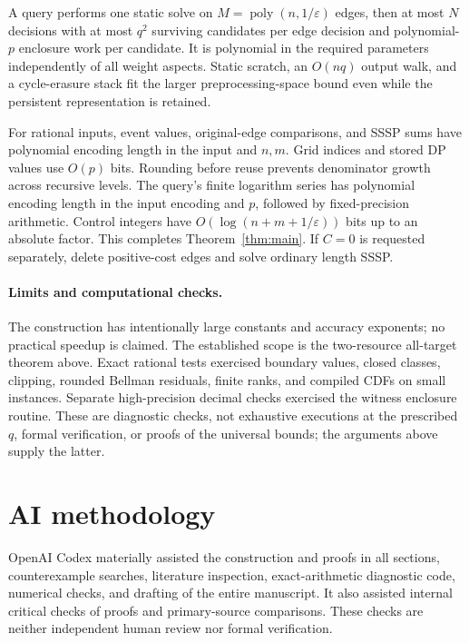 \documentclass[acmsmall,11pt,screen,nonacm]{acmart}
\begin{document}
A query performs one static solve on $M=\operatorname{poly}(n,1/\varepsilon)$ edges, then at most $N$ decisions with at most $q^2$ surviving candidates per edge decision and polynomial-$p$ enclosure work per candidate. It is polynomial in the required parameters independently of all weight aspects. Static scratch, an $O(nq)$ output walk, and a cycle-erasure stack fit the larger preprocessing-space bound even while the persistent representation is retained.

For rational inputs, event values, original-edge comparisons, and SSSP sums have polynomial encoding length in the input and $n,m$. Grid indices and stored DP values use $O(p)$ bits. Rounding before reuse prevents denominator growth across recursive levels. The query's finite logarithm series has polynomial encoding length in the input encoding and $p$, followed by fixed-precision arithmetic. Control integers have $O(\log(n+m+1/\varepsilon))$ bits up to an absolute factor. This completes Theorem~\ref{thm:main}. If $C=0$ is requested separately, delete positive-cost edges and solve ordinary length SSSP.

\paragraph{Limits and computational checks.}
The construction has intentionally large constants and accuracy exponents; no practical speedup is claimed. The established scope is the two-resource all-target theorem above. Exact rational tests exercised boundary values, closed classes, clipping, rounded Bellman residuals, finite ranks, and compiled CDFs on small instances. Separate high-precision decimal checks exercised the witness enclosure routine. These are diagnostic checks, not exhaustive executions at the prescribed $q$, formal verification, or proofs of the universal bounds; the arguments above supply the latter.




\section*{AI methodology}
OpenAI Codex materially assisted the construction and proofs in all sections, counterexample searches, literature inspection, exact-arithmetic diagnostic code, numerical checks, and drafting of the entire manuscript. It also assisted internal critical checks of proofs and primary-source comparisons. These checks are neither independent human review nor formal verification.
\end{document}

